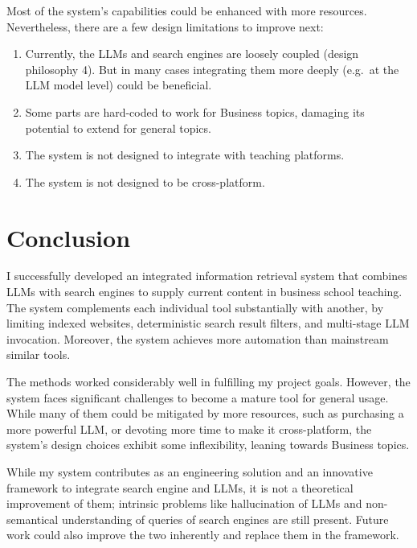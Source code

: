 \documentclass[final-report]{report-template}
\begin{document}
Most of the system's capabilities could be enhanced with more resources.
Nevertheless, there are a few design limitations to improve next: 
\begin{enumerate}
	\item Currently, the LLMs and search engines are loosely coupled (design
		philosophy 4). But in many cases integrating them more deeply (e.g.\ at
		the LLM model level) could be beneficial.
	\item Some parts are hard-coded to work for Business topics, damaging its
		potential to extend for general topics.
	\item The system is not designed to integrate with teaching platforms.
	\item The system is not designed to be cross-platform.
\end{enumerate}

\section{Conclusion}
I successfully developed an integrated information retrieval system
that combines LLMs with search engines to supply current content in business
school teaching. The system complements each individual tool substantially with
another, by limiting indexed websites, deterministic search result filters, and
multi-stage LLM invocation. Moreover, the system achieves more automation than
mainstream similar tools.

The methods worked considerably well in fulfilling my project goals. However,
the system faces significant challenges to become a mature tool for general
usage. While many of them could be mitigated by more resources, such as
purchasing a more powerful LLM, or devoting more time to make it
cross-platform, the system's design choices exhibit some inflexibility, leaning
towards Business topics.

While my system contributes as an engineering solution and an innovative
framework to integrate search engine and LLMs, it is not a theoretical
improvement of them; intrinsic problems like hallucination of LLMs and
non-semantical understanding of queries of search engines are still present.
Future work could also improve the two inherently and replace them in the
framework.

\clearpage

 

\end{document}
